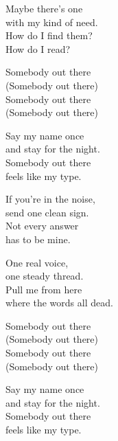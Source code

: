 \begin{lyrics}
Maybe there’s one\\
with my kind of need.\\
How do I find them?\\
How do I read?

Somebody out there\\
(Somebody out there)\\
Somebody out there\\
(Somebody out there)

Say my name once\\
and stay for the night.\\
Somebody out there\\
feels like my type.

If you’re in the noise,\\
send one clean sign.\\
Not every answer\\
has to be mine.

One real voice,\\
one steady thread.\\
Pull me from here\\
where the words all dead.

Somebody out there\\
(Somebody out there)\\
Somebody out there\\
(Somebody out there)

Say my name once\\
and stay for the night.\\
Somebody out there\\
feels like my type.

\end{lyrics}

